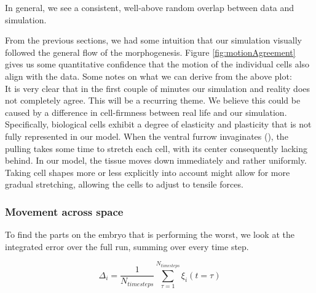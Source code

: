 In general, we see a consistent, well-above random overlap between data and simulation. 

From the previous sections, we had some intuition that our simulation visually followed the general flow of the morphogenesis. Figure \ref{fig:motionAgreement} gives us some quantitative confidence that the motion of the individual cells also align with the data. 
Some notes on what we can derive from the above plot:\\

It is very clear that in the first couple of minutes our simulation and reality does not completely agree. This will be a recurring theme. We believe this could be caused by a difference in cell-firmness between real life and our simulation. Specifically, biological cells exhibit a degree of elasticity and plasticity that is not fully represented in our model. When the ventral furrow invaginates (), the pulling takes some time to stretch each cell, with its center consequently lacking behind. In our model, the tissue moves down immediately and rather uniformly. Taking cell shapes more or less explicitly into account might allow for more gradual stretching, allowing the cells to adjust to tensile forces.\\





\subsubsection{Movement across space}

To find the parts on the embryo that is performing the worst, we look at the integrated error over the full run, summing over every time step.

\begin{equation}
     \label{eq:Delta-measure}
     \Delta_i = \frac{1}{N_{timesteps}}\sum_{\tau = 1}^{N_{timesteps}}\xi_i(t=\tau)
\end{equation}

